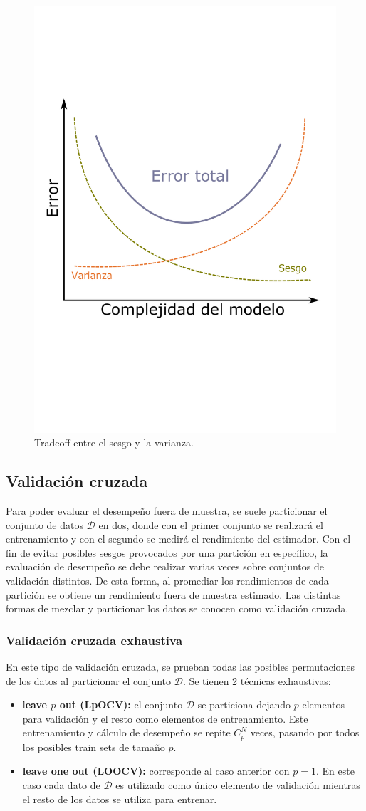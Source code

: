 \begin{figure}[h]
    \centering
    \includegraphics[width = 0.4\linewidth]{img/cap5_biasvariance.pdf}
    \caption{Tradeoff entre el sesgo y la varianza.}
\end{figure}


\subsection{Validación cruzada}

Para poder evaluar el desempeño fuera de muestra, se suele particionar el conjunto de datos $\mathcal{D}$ en dos, donde con el primer conjunto se realizará el entrenamiento y con el segundo se medirá el rendimiento del estimador. Con el fin de evitar posibles sesgos provocados por una partición en específico, la evaluación de desempeño se debe realizar varias veces sobre conjuntos de validación distintos. De esta forma, al promediar los rendimientos de cada partición se obtiene un rendimiento fuera de muestra estimado. Las distintas formas de mezclar y particionar los datos se conocen como validación cruzada.

\subsubsection{Validación cruzada exhaustiva}

En este tipo de validación cruzada, se prueban todas las posibles permutaciones de los datos al particionar el conjunto $\mathcal{D}$. Se tienen 2 técnicas exhaustivas:

\begin{itemize}
	\item l\textbf{eave $p$ out (LpOCV):} el conjunto $\mathcal{D}$ se particiona dejando $p$ elementos para validación y el resto como elementos de entrenamiento. Este entrenamiento y cálculo de desempeño se repite $C_p^N$ veces, pasando por todos los posibles train sets de tamaño $p$.
	\item \textbf{leave one out (LOOCV):} corresponde al caso anterior con $p=1$. En este caso cada dato de $\mathcal{D}$ es utilizado como único elemento de validación mientras el resto de los datos se utiliza para entrenar.
\end{itemize}

